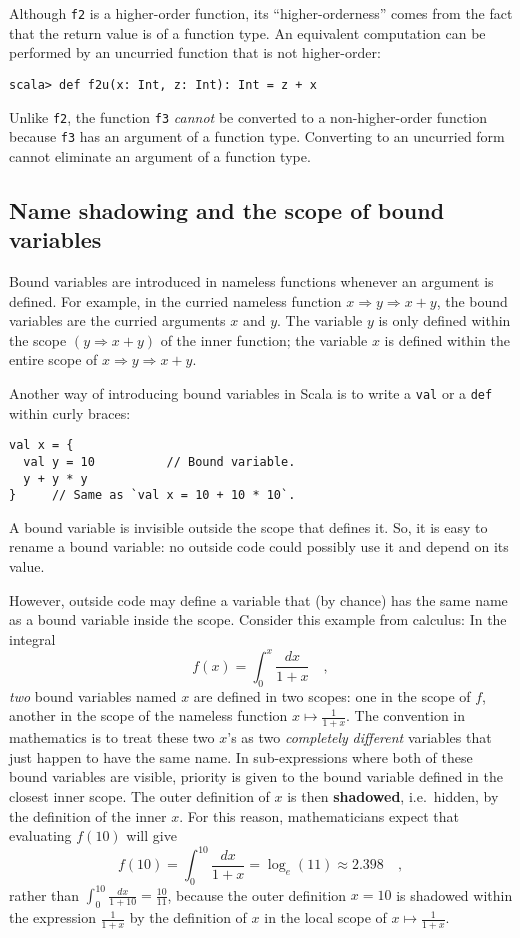 Although \texttt{}\lstinline!f2! is a higher-order function, its
``higher-orderness'' comes from the fact that the return value is
of a function type. An equivalent computation can be performed by
an uncurried function that is not higher-order:
\begin{lstlisting}
scala> def f2u(x: Int, z: Int): Int = z + x
\end{lstlisting}
Unlike \lstinline!f2!, the function \lstinline!f3! \emph{cannot}
be converted to a non-higher-order function because \lstinline!f3!
has an argument of a function type. Converting to an uncurried form
cannot eliminate an argument of a function type.

\subsection{Name shadowing and the scope of bound variables}

Bound variables are introduced in nameless functions whenever an argument
is defined. For example, in the curried nameless function $x\Rightarrow y\Rightarrow x+y$,
the bound variables are the curried arguments $x$ and $y$. The variable
$y$ is only defined within the scope $\left(y\Rightarrow x+y\right)$
of the inner function; the variable $x$ is defined within the entire
scope of $x\Rightarrow y\Rightarrow x+y$.

Another way of introducing bound variables in Scala is to write a
\lstinline!val! or a \lstinline!def! within curly braces:
\begin{lstlisting}
val x = {
  val y = 10          // Bound variable.
  y + y * y
}     // Same as `val x = 10 + 10 * 10`.
\end{lstlisting}

A bound variable is invisible outside the scope that defines it. So,
it is easy to rename a bound variable: no outside code could possibly
use it and depend on its value.

However, outside code may define a variable that (by chance) has the
same name as a bound variable inside the scope. Consider this example
from calculus: In the integral
\[
f(x)=\int_{0}^{x}\frac{dx}{1+x}\quad,
\]
\emph{two} bound variables named $x$ are defined in two scopes: one
in the scope of $f$, another in the scope of the nameless function
$x\mapsto\frac{1}{1+x}$. The convention in mathematics is to treat
these two $x$'s as two \emph{completely} \emph{different} variables
that just happen to have the same name. In sub-expressions where both
of these bound variables are visible, priority is given to the bound
variable defined in the closest inner scope. The outer definition
of $x$ is then \textbf{shadowed}, i.e.\ hidden,
by the definition of the inner $x$. For this reason, mathematicians
expect that evaluating $f(10)$ will give
\[
f(10)=\int_{0}^{10}\frac{dx}{1+x}=\log_{e}(11)\approx2.398\quad,
\]
rather than $\int_{0}^{10}\frac{dx}{1+10}=\frac{10}{11}$, because
the outer definition $x=10$ is shadowed within the expression $\frac{1}{1+x}$
by the definition of $x$ in the local scope of $x\mapsto\frac{1}{1+x}$.

